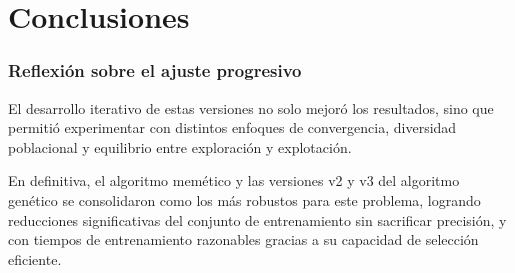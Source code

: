 
\chapter{Conclusiones}\label{ch:conclusiones}

\subsection{Reflexión sobre el ajuste progresivo}\label{sec:reflexion-sobre-el-ajuste-progresivo}
El desarrollo iterativo de estas versiones no solo mejoró los resultados, sino que permitió experimentar con distintos enfoques de convergencia,
diversidad poblacional y equilibrio entre exploración y explotación.

En definitiva, el algoritmo memético y las versiones v2 y v3 del algoritmo genético se consolidaron como los más robustos para este problema,
logrando reducciones significativas del conjunto de entrenamiento sin sacrificar precisión, y con tiempos de entrenamiento razonables gracias
a su capacidad de selección eficiente.